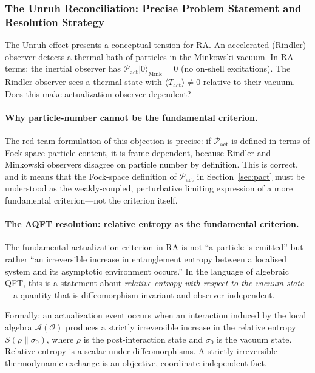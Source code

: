 \documentclass[11pt,a4paper]{article}
\theoremstyle{plain}
\theoremstyle{definition}
\theoremstyle{remark}
\newcommand{\Pact}{\mathcal{P}_{\mathrm{act}}}
\newcommand{\ket}[1]{|#1\rangle}
\begin{document}
\subsubsection{The Unruh Reconciliation: Precise Problem Statement and
Resolution Strategy}

The Unruh effect presents a conceptual tension for RA. An accelerated (Rindler)
observer detects a thermal bath of particles in the Minkowski vacuum. In RA terms:
the inertial observer has $\Pact\ket{0}_{\mathrm{Mink}} = 0$ (no on-shell
excitations). The Rindler observer sees a thermal state with $\langle
T_{\mathrm{act}}\rangle \neq 0$ relative to their vacuum. Does this make
actualization observer-dependent?

\paragraph{Why particle-number cannot be the fundamental criterion.}
The red-team formulation of this objection is precise: if $\Pact$ is defined in
terms of Fock-space particle content, it is frame-dependent, because Rindler and
Minkowski observers disagree on particle number by definition. This is correct,
and it means that the Fock-space definition of $\Pact$ in
Section~\ref{sec:pact} must be understood as the weakly-coupled, perturbative
limiting expression of a more fundamental criterion---not the criterion itself.

\paragraph{The AQFT resolution: relative entropy as the fundamental criterion.}
The fundamental actualization criterion in RA is not ``a particle is emitted''
but rather ``an irreversible increase in entanglement entropy between a
localised system and its asymptotic environment occurs.'' In the language of
algebraic QFT, this is a statement about \emph{relative entropy with respect to
the vacuum state}---a quantity that is diffeomorphism-invariant and
observer-independent.

Formally: an actualization event occurs when an interaction induced by the
local algebra $\mathcal{A}(\mathcal{O})$ produces a strictly irreversible
increase in the relative entropy $S(\rho \| \sigma_0)$, where $\rho$ is the
post-interaction state and $\sigma_0$ is the vacuum state. Relative entropy is a
scalar under diffeomorphisms. A strictly irreversible thermodynamic exchange is
an objective, coordinate-independent fact.
\end{document}
